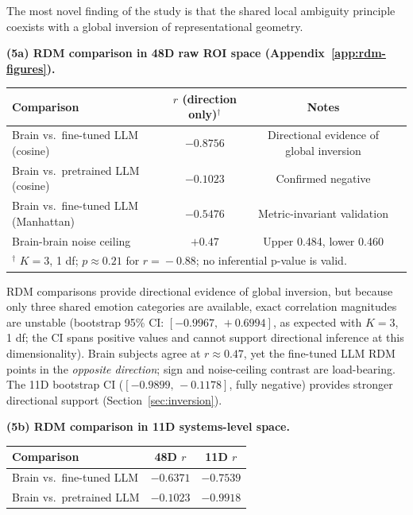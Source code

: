 \documentclass{article}
\begin{document}
The most novel finding of the study is that the shared local ambiguity principle
coexists with a global inversion of representational geometry.

\textbf{(5a) RDM comparison in 48D raw ROI space (Appendix~\ref{app:rdm-figures}).}

\begin{center}
\small
\begin{tabular}{lccc}
\toprule
Comparison & $r$ (direction only)$^\dagger$ & Notes \\
\midrule
Brain vs.\ fine-tuned LLM (cosine)   & $-0.8756$ & Directional evidence of global inversion \\
Brain vs.\ pretrained LLM (cosine)   & $-0.1023$ & Confirmed negative \\
Brain vs.\ fine-tuned LLM (Manhattan)& $-0.5476$ & Metric-invariant validation \\
Brain-brain noise ceiling             & $+0.47$   & Upper 0.484, lower 0.460 \\
\bottomrule
\multicolumn{3}{l}{$^\dagger$ $K\!=\!3$, 1 df; $p\!\approx\!0.21$ for $r\!=\!-0.88$; no inferential p-value is valid.}
\end{tabular}
\end{center}

RDM comparisons provide directional evidence of global inversion, but because only
three shared emotion categories are available, exact correlation magnitudes are
unstable (bootstrap 95\% CI: $[-0.9967,\,+0.6994]$, as expected with $K\!=\!3$, 1 df;
the CI spans positive values and cannot support directional inference at this dimensionality).
Brain subjects agree at $r\!\approx\!0.47$, yet the fine-tuned LLM RDM points in the
\emph{opposite direction}; sign and noise-ceiling contrast are load-bearing.
The 11D bootstrap CI ($[-0.9899,\,-0.1178]$, fully negative) provides stronger
directional support (Section~\ref{sec:inversion}).

\textbf{(5b) RDM comparison in 11D systems-level space.}

\begin{center}
\small
\begin{tabular}{lcc}
\toprule
Comparison & 48D $r$ & 11D $r$ \\
\midrule
Brain vs.\ fine-tuned LLM  & $-0.6371$ & $-0.7539$ \\
Brain vs.\ pretrained LLM  & $-0.1023$ & $-0.9918$ \\
\bottomrule
\end{tabular}
\end{center}
\end{document}
